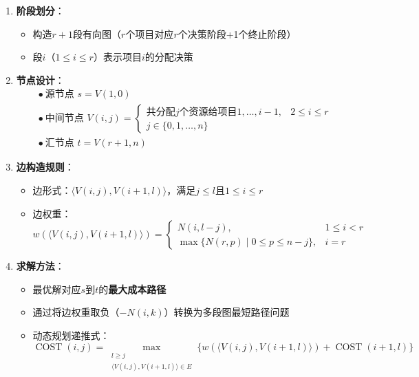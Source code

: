 \documentclass[./../main.tex]{subfiles}
\begin{document}
\begin{enumerate}
    \item \textbf{阶段划分}：
    \begin{itemize}
        \item 构造$r+1$段有向图（$r$个项目对应$r$个决策阶段+1个终止阶段）
        \item 段$i$（$1 \leq i \leq r$）表示项目$i$的分配决策
    \end{itemize}
    
    \item \textbf{节点设计}：
    \begin{align*}
        &\bullet\ \text{源节点 } s = V(1,0) \\
        &\bullet\ \text{中间节点 } V(i,j) = 
        \begin{cases}
            \text{共分配$j$个资源给项目$1,\dots,i-1$}, & 2 \leq i \leq r \\
            j \in \{0,1,\dots,n\}
        \end{cases} \\
        &\bullet\ \text{汇节点 } t = V(r+1,n)
    \end{align*}
    
    \item \textbf{边构造规则}：
    \begin{itemize}
        \item 边形式：$\langle V(i,j), V(i+1,l) \rangle$，满足$j \leq l$且$1 \leq i \leq r$
        \item 边权重：
        $$
        w(\langle V(i,j), V(i+1,l) \rangle) = 
        \begin{cases}
            N(i,l-j), & 1 \leq i < r \\
            \max \{ N(r,p) \mid 0 \leq p \leq n-j \}, & i = r
        \end{cases}
        $$
    \end{itemize}
    
    \item \textbf{求解方法}：
    \begin{itemize}
        \item 最优解对应$s$到$t$的\textbf{最大成本路径}
        \item 通过将边权重取负（$-N(i,k)$）转换为多段图最短路径问题
        \item 动态规划递推式：
        $$
        \operatorname{COST}(i,j) = \max_{\substack{l \geq j \\ \langle V(i,j), V(i+1,l) \rangle \in E}} \big\{ w(\langle V(i,j), V(i+1,l) \rangle) + \operatorname{COST}(i+1,l) \big\}
        $$
    \end{itemize}
\end{enumerate}
\end{document}
